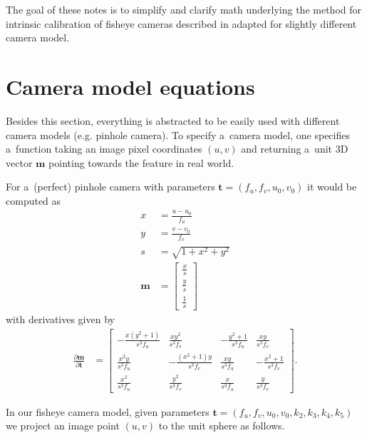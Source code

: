 \documentclass[12pt,a4paper]{amsart}
\renewcommand{\v}[1]{\mathbf{#1}}
\newcommand{\ddd}[2]{\frac{\partial #1}{\partial #2}}
\begin{document}
The goal of these notes is to simplify and clarify math underlying the method for intrinsic calibration of fisheye cameras described in \cite{Kan} adapted for slightly different camera model.

\section{Camera model equations}

Besides this section, everything is abstracted to be easily used with different camera models (e.g. pinhole camera).
To specify a~camera model, one specifies a~function taking an image pixel coordinates $(u, v)$ and returning a~unit 3D vector $\v{m}$ pointing towards the feature in real world.

For a~(perfect) pinhole camera with parameters $\v{t} = (f_u, f_v, u_0, v_0)$ it would be computed as
\begin{align*}
  x & = \frac{u - u_0}{f_u} \\
  y & = \frac{v - v_0}{f_v} \\
  s & = \sqrt{1 + x^2 + y^2} \\
  \v{m} & = \left[ \begin{array}{c} \frac{x}{s} \\ \frac{y}{s} \\ \frac{1}{s} \end{array} \right]
\end{align*}
with derivatives given by
\begin{align*}
\ddd{\v{m}}{\v{t}} & = 
  \left[ \begin{array}{cccccccc}
    -\frac{x(y^2 + 1)}{s^3f_u} &  \frac{xy^2}{s^3f_v}       & -\frac{y^2 + 1}{s^3f_u} &  \frac{xy}{s^3f_v}      \\
     \frac{x^2 y}{s^3f_u}      & -\frac{(x^2 + 1)y}{s^3f_v} &  \frac{xy}{s^3f_u}      & -\frac{x^2 + 1}{s^3f_v} \\
     \frac{x^2}{s^3f_u}        &  \frac{y^2}{s^3f_v}        &  \frac{x}{s^3f_u}       &  \frac{y}{s^3f_v}
  \end{array} \right].
\end{align*}

In our fisheye camera model, given parameters $\v{t} = (f_u, f_v, u_0, v_0, k_2, k_3, k_4, k_5)$ we project an image point $(u, v)$ to the unit sphere as follows.
\end{document}
